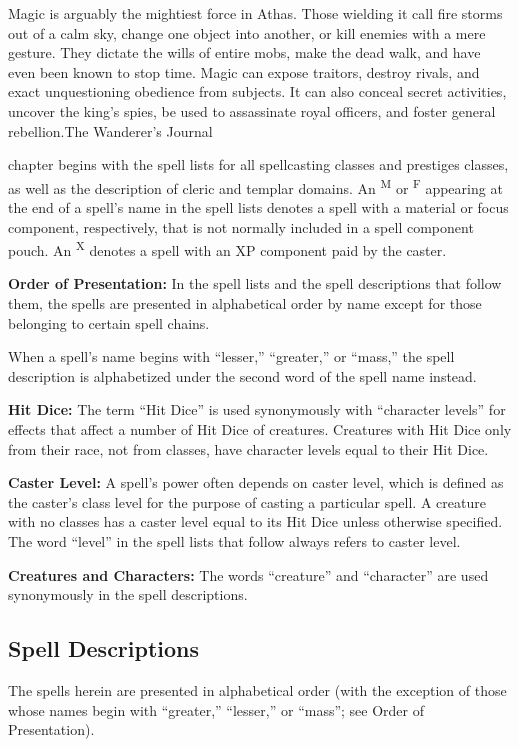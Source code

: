 {Magic is arguably the mightiest force in Athas. Those wielding it call fire storms out of a calm sky, change one object into another, or kill enemies with a mere gesture. They dictate the wills of entire mobs, make the dead walk, and have even been known to stop time. Magic can expose traitors, destroy rivals, and exact unquestioning obedience from subjects. It can also conceal secret activities, uncover the king's spies, be used to assassinate royal officers, and foster general rebellion.}{The Wanderer's Journal}

 chapter begins with the spell lists for all spellcasting classes and prestiges classes, as well as the description of cleric and templar domains. An \textsuperscript{M} or \textsuperscript{F} appearing at the end of a spell's name in the spell lists denotes a spell with a material or focus component, respectively, that is not normally included in a spell component pouch. An \textsuperscript{X} denotes a spell with an XP component paid by the caster.

\textbf{Order of Presentation:} In the spell lists and the spell descriptions that follow them, the spells are presented in alphabetical order by name except for those belonging to certain spell chains.

When a spell's name begins with ``lesser,'' ``greater,'' or ``mass,'' the spell description is alphabetized under the second word of the spell name instead.

\textbf{Hit Dice:} The term ``Hit Dice'' is used synonymously with ``character levels'' for effects that affect a number of Hit Dice of creatures. Creatures with Hit Dice only from their race, not from classes, have character levels equal to their Hit Dice.

\textbf{Caster Level:} A spell's power often depends on caster level, which is defined as the caster's class level for the purpose of casting a particular spell. A creature with no classes has a caster level equal to its Hit Dice unless otherwise specified. The word ``level'' in the spell lists that follow always refers to caster level.

\textbf{Creatures and Characters:} The words ``creature'' and ``character'' are used synonymously in the spell descriptions.





% 

\vskip3cm




\clearpage
\begin{strip}
\section{Spell Descriptions}
The spells herein are presented in alphabetical order (with the exception of those whose names begin with ``greater,'' ``lesser,'' or ``mass''; see Order of Presentation).
\end{strip}

